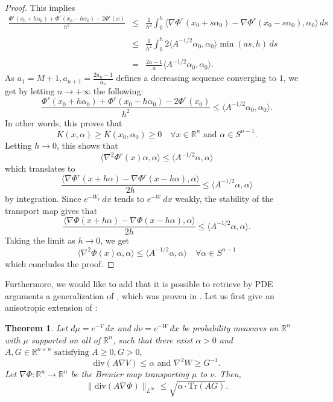 \documentclass[11pt,a4paper,reqno]{amsart}
\numberwithin{equation}{section}
\newtheorem{theorem}{Theorem}[section]
\theoremstyle{definition}
\newcommand{\ds}{\displaystyle}
\newcommand{\<}{\ensuremath \leq}
\renewcommand{\>}{\ensuremath \geq}
\begin{document}
\begin{proof}
    This implies $$\begin{array}{lll}
    \ds \frac{\Phi^r(x_0+h\alpha_0)+\Phi^r(x_0-h\alpha_0)-2\Phi^r(x)}{h^2} &\le& \ds \frac1{h^2}\int_0^h \langle \nabla \Phi^r(x_0+s\alpha_0)-\nabla \Phi^r(x_0-s\alpha_0),\alpha_0\rangle \, ds \\ \\
    &\le& \ds \frac1{h^2}\int_0^h 2\langle A^{-1/2}\alpha_0,\alpha_0\rangle \min(a s,h)\, ds \\ \\
    &=& \ds \frac{2a-1}{a}\langle A^{-1/2}\alpha_0,\alpha_0\rangle.
    \end{array}$$
    As $a_1=M+1, a_{n+1}=\frac{2a_n-1}{a_n}$ defines a decreasing sequence converging to $1$, we get by letting $n \rightarrow +\infty$ the following: $$\frac{\Phi^r(x_0+h\alpha_0)+\Phi^r(x_0-h\alpha_0)-2\Phi^r(x_0)}{h^2} \le \langle A^{-1/2}\alpha_0,\alpha_0\rangle.$$
    In other words, this proves that $$K(x,\alpha) \ge K(x_0,\alpha_0) \ge  0 \quad \forall x \in \mathbb{R}^n \text{ and } \alpha \in S^{n-1}.$$ Letting $h\rightarrow 0$, this shows that $$\langle \nabla^2 \Phi^r(x)\alpha,\alpha\rangle \leq \langle A^{-1/2}\alpha,\alpha\rangle$$ which translates to $$\frac{\langle \nabla \Phi^r(x+h\alpha)-\nabla \Phi^r(x-h\alpha),\alpha\rangle}{2h} \leq \langle A^{-1/2}\alpha,\alpha \rangle$$ by integration. Since $e^{-W_r}\, dx$ tends to $e^{-W}\, dx$ weakly, the stability of the transport map gives that $$\frac{\langle \nabla \Phi(x+h\alpha)-\nabla \Phi(x-h\alpha),\alpha \rangle}{2h} \leq \langle A^{-1/2}\alpha,\alpha \rangle.$$ Taking the limit as $h \rightarrow 0$, we get $$\langle \nabla^2 \Phi(x)\alpha,\alpha\rangle \leq \langle A^{-1/2}\alpha,\alpha \rangle \quad \forall \alpha \in S^{n-1}$$ which concludes the proof.
\end{proof}

\bigskip

Furthermore, we would like to add that it is possible to retrieve by PDE arguments a generalization of \cite{Guido}, which was proven in \cite{Gozlan}. Let us first give an anisotropic extension of \cite[Thm 1.4]{Guido}:

\begin{theorem} \label{De_Phil_Shenfeld_contraction}
    Let $d\mu=e^{-V}\, dx$ and $d\nu=e^{-W}\, dx$ be probability measures on $\mathbb{R}^n$ with $\mu$ supported on all of $\mathbb{R}^n$, such that there exist $\alpha>0$ and $A,G \in \mathbb{R}^{n \times n} \text{ satisfying } A \geq 0 , G>0,$ $$\mathrm{div}(A \nabla V) \leq \alpha \text{ and } \nabla^2 W \geq G^{-1}.$$ Let $\nabla \Phi : \mathbb{R}^n \rightarrow \mathbb{R}^n$ be the Brenier map transporting $\mu$ to $\nu.$ Then, $$\| \mathrm{div}(A\nabla \Phi)\|_{L^\infty} \leq \sqrt{\alpha \cdot \mathrm{Tr}(AG)}.$$ 
\end{theorem}
\end{document}
